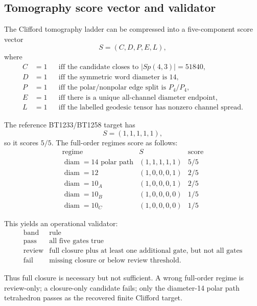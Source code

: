 \subsection{Tomography score vector and validator}
\label{sec:bt1267-tomography-score-vector}

The Clifford tomography ladder can be compressed into a five-component score vector
\[
S=(C,D,P,E,L),
\]
where
\[
\begin{aligned}
C&=1 &&\text{iff the candidate closes to } |Sp(4,3)|=51840,\\
D&=1 &&\text{iff the symmetric word diameter is }14,\\
P&=1 &&\text{iff the polar/nonpolar edge split is }P_4/P_4,\\
E&=1 &&\text{iff there is a unique all-channel diameter endpoint,}\\
L&=1 &&\text{iff the labelled geodesic tensor has nonzero channel spread.}
\end{aligned}
\]

The reference BT1233/BT1258 target has
\[
S=(1,1,1,1,1),
\]
so it scores \(5/5\).  The full-order regimes score as follows:
\[
\begin{array}{c|c|c}
\text{regime} & S & \text{score}\\
\hline
\operatorname{diam}=14\text{ polar path} & (1,1,1,1,1) & 5/5\\
\operatorname{diam}=12 & (1,0,0,0,1) & 2/5\\
\operatorname{diam}=10_A & (1,0,0,0,1) & 2/5\\
\operatorname{diam}=10_B & (1,0,0,0,0) & 1/5\\
\operatorname{diam}=10_C & (1,0,0,0,0) & 1/5
\end{array}
\]

This yields an operational validator:
\[
\begin{array}{c|c}
\text{band} & \text{rule}\\
\hline
\mathrm{pass} & \text{all five gates true}\\
\mathrm{review} & \text{full closure plus at least one additional gate, but not all gates}\\
\mathrm{fail} & \text{missing closure or below review threshold.}
\end{array}
\]

Thus full closure is necessary but not sufficient.  A wrong full-order regime is review-only; a closure-only candidate fails; only the diameter-14 polar path tetrahedron passes as the recovered finite Clifford target.
